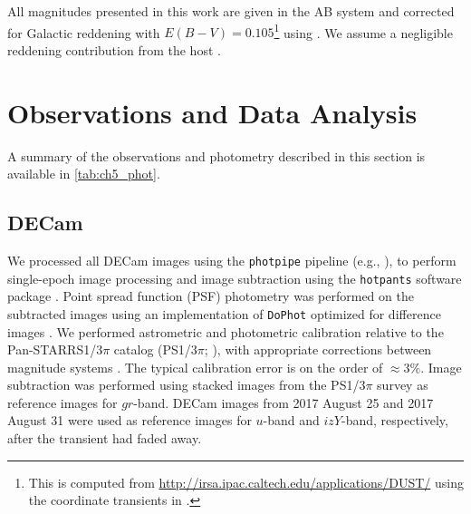 \clearpage
All magnitudes presented in this work are given in the AB system and corrected for Galactic reddening with $E(B-V)=0.105$\footnote{\singlespace This is computed from \url{http://irsa.ipac.caltech.edu/applications/DUST/} using the coordinate transients in \cite{GW170817DECam}.} using \cite{SchlaflyFinkbeiner11}. We assume a negligible reddening contribution from the host \citep{Blanchard+17}.

\section{Observations and Data Analysis}
\label{sec:ch5_observations}

A summary of the observations and photometry described in this section is available in \cref{tab:ch5_phot}.

\subsection{DECam}
\label{sec:ch5_data}
We processed all DECam images using the {\tt photpipe} pipeline (e.g., \citealt{Rest+05,Rest+14}), to perform single-epoch image processing and image subtraction using the {\tt hotpants} software package \citep{Becker2015}. Point spread function (PSF) photometry was performed on the subtracted images using an implementation of {\tt DoPhot} optimized for difference images \citep{Schechter+93}. We performed astrometric and photometric calibration relative to the Pan-STARRS1/$3\pi$ catalog (PS1/$3\pi$; \citealt{Chambers+16}), with appropriate corrections between magnitude systems \citep{Scolnic+15}. The typical calibration error is on the order of $\approx3\%$. Image subtraction was performed using stacked images from the PS1/$3\pi$ survey as reference images for $gr$-band. DECam images from 2017 August 25 and 2017 August 31 were used as reference images for $u$-band and $izY$-band, respectively, after the transient had faded away.

